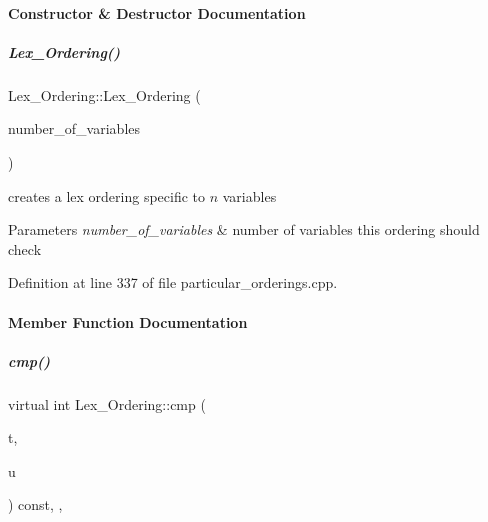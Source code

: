 \paragraph{Constructor \& Destructor Documentation}
\mbox{\label{group__orderinggroup_a35968aecc4009c0d15bfd357ccf74a5f}} 
\subparagraph{\texorpdfstring{Lex\+\_\+\+Ordering()}{Lex\_Ordering()}}
{\footnotesize\ttfamily Lex\+\_\+\+Ordering\+::\+Lex\+\_\+\+Ordering (\begin{DoxyParamCaption}\item[{N\+V\+A\+R\+\_\+\+T\+Y\+PE}]{number\+\_\+of\+\_\+variables }\end{DoxyParamCaption})}



creates a lex ordering specific to $n$ variables 


\begin{DoxyParams}{Parameters}
{\em number\+\_\+of\+\_\+variables} & number of variables this ordering should check \\
\hline
\end{DoxyParams}


Definition at line 337 of file particular\+\_\+orderings.\+cpp.



\paragraph{Member Function Documentation}
\mbox{\label{group__orderinggroup_a44d74f3b1e29abde22334f455979a67f}} 
\subparagraph{\texorpdfstring{cmp()}{cmp()}}
{\footnotesize\ttfamily virtual int Lex\+\_\+\+Ordering\+::cmp (\begin{DoxyParamCaption}\item[{const \hyperlink{group__polygroup_class_monomial}{Monomial} \&}]{t,  }\item[{const \hyperlink{group__polygroup_class_monomial}{Monomial} \&}]{u }\end{DoxyParamCaption}) const\hspace{0.3cm}{\ttfamily [inline]}, {\ttfamily [override]}, {\ttfamily [virtual]}}


